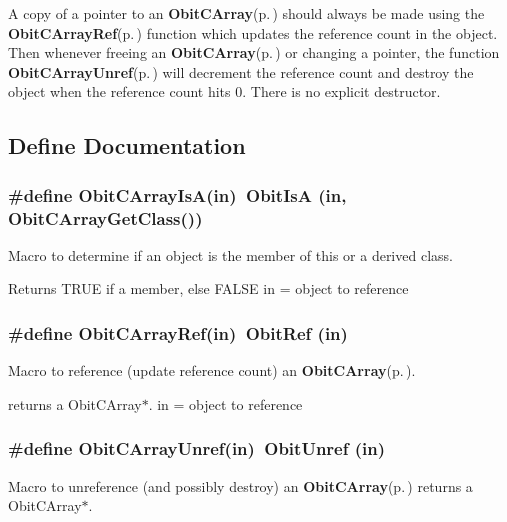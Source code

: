 A copy of a pointer to an {\bf Obit\-CArray}{\rm (p.\,\pageref{structObitCArray})} should always be made using the {\bf Obit\-CArray\-Ref}{\rm (p.\,\pageref{ObitCArray_8h_a1})} function which updates the reference count in the object. Then whenever freeing an {\bf Obit\-CArray}{\rm (p.\,\pageref{structObitCArray})} or changing a pointer, the function {\bf Obit\-CArray\-Unref}{\rm (p.\,\pageref{ObitCArray_8h_a0})} will decrement the reference count and destroy the object when the reference count hits 0. There is no explicit destructor.

\subsection{Define Documentation}
\subsubsection{\setlength{\rightskip}{0pt plus 5cm}\#define Obit\-CArray\-Is\-A(in)\ Obit\-Is\-A (in, Obit\-CArray\-Get\-Class())}\label{ObitCArray_8h_a2}


Macro to determine if an object is the member of this or a derived class. 

Returns TRUE if a member, else FALSE in = object to reference 
\subsubsection{\setlength{\rightskip}{0pt plus 5cm}\#define Obit\-CArray\-Ref(in)\ Obit\-Ref (in)}\label{ObitCArray_8h_a1}


Macro to reference (update reference count) an {\bf Obit\-CArray}{\rm (p.\,\pageref{structObitCArray})}. 

returns a Obit\-CArray$\ast$. in = object to reference 
\subsubsection{\setlength{\rightskip}{0pt plus 5cm}\#define Obit\-CArray\-Unref(in)\ Obit\-Unref (in)}\label{ObitCArray_8h_a0}


Macro to unreference (and possibly destroy) an {\bf Obit\-CArray}{\rm (p.\,\pageref{structObitCArray})} returns a Obit\-CArray$\ast$. 

